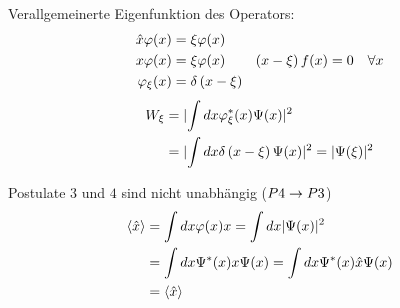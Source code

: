 \begin{bem}
    \begin{erl}{Verallgemeinerte Eigenfunktion des Operators:}
     \begin{align*}
        \hat{x}\varphi(x) &= \xi \varphi(x) \\
        x \varphi(x) &= \xi \varphi(x) \qquad \left( x-\xi \right)  f(x) = 0 \quad \forall x \\
        \varphi_\xi (x) &= \delta \left( x - \xi \right) 
     \end{align*}
     \begin{align*}
         W_\xi 
         &=
         \lvert \int dx \varphi_\xi^* (x) \Psi(x) \rvert^2 \\
         &=
         \lvert \int dx \delta \left( x - \xi \right) \Psi(x) \rvert^2 
         = \lvert \Psi(\xi)\rvert^2
     \end{align*}
    \end{erl}    
    \item
    Postulate $3$ und $4$ sind nicht unabhängig ($P4 \rightarrow P3$)
    \begin{align*}
        \left\langle \hat{x} \right\rangle
        &=
        \int dx \varphi(x)x = \int dx \lvert \Psi(x) \rvert^2 \\
        &=
        \int dx \Psi^*(x) x \Psi(x) = \int dx \Psi^*(x) \hat{x} \Psi(x) \\
        &=
        \left\langle \hat{x} \right\rangle
    \end{align*}
\end{bem}
